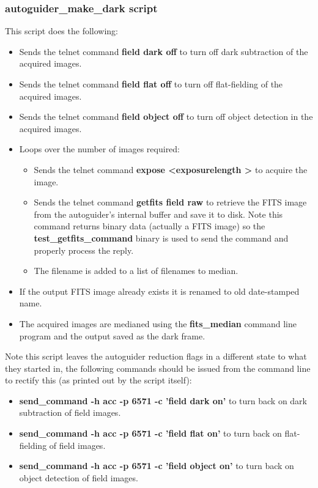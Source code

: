 \documentclass[10pt,a4paper]{article}
\begin{document}
\subsubsection{autoguider\_make\_dark script}

This script does the following:

\begin{itemize}
\item Sends the telnet command {\bf field dark off} to turn off dark subtraction of the acquired images.
\item Sends the telnet command {\bf field flat off} to turn off flat-fielding of the acquired images.
\item Sends the telnet command {\bf field object off} to turn off object detection in the acquired images.
\item Loops over the number of images required:
         \begin{itemize}
         \item Sends the telnet command {\bf expose \textless exposurelength \textgreater} to acquire the image.
	 \item  Sends the telnet command {\bf getfits field raw} to retrieve the FITS image from the autoguider's internal buffer and save it to disk. Note this command returns binary data (actually a FITS image) so the {\bf test\_getfits\_command} binary is used to send the command and properly process the reply.
	 \item The filename is added to a list of filenames to median.
         \end{itemize}
\item If the output FITS image already exists it is renamed to old date-stamped name.
\item The acquired images are medianed using the {\bf fits\_median} command line program and the output saved as the
dark frame.
\end{itemize}

Note this script leaves the autoguider reduction flags in a different state to what they started in, the following commands should be issued from the command line to rectify this (as printed out by the script itself):
\begin{itemize}
\item {\bf send\_command -h acc -p  6571 -c 'field dark on'} to turn back on dark subtraction of field images.
\item {\bf send\_command -h acc -p  6571 -c 'field flat on'} to turn back on flat-fielding of field images.
\item {\bf send\_command -h acc -p  6571 -c 'field object on'} to turn back on object detection of field images.
\end{itemize}
\end{document}
